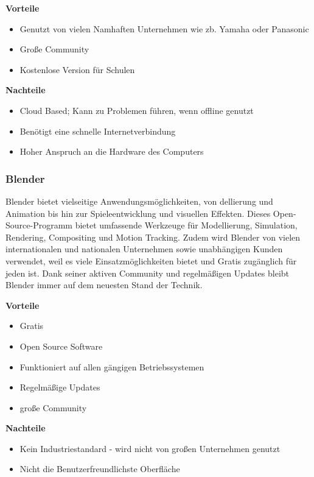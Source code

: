 \textbf{Vorteile}
\begin{itemize}
	\item Genutzt von vielen Namhaften Unternehmen wie zb. Yamaha oder Panasonic
	\item Große Community
	\item Kostenlose Version für Schulen
\end{itemize} 

\textbf{Nachteile}
\begin{itemize}
	\item Cloud Based; Kann zu Problemen führen, wenn offline genutzt 
	\item Benötigt eine schnelle Internetverbindung
	\item Hoher Anspruch an die Hardware des Computers
\end{itemize}
\cite{AutodeskFusionReviews}


\subsubsection{Blender} 
Blender bietet vielseitige Anwendungsmöglichkeiten, von dellierung und Animation bis hin zur Spieleentwicklung und visuellen Effekten. Dieses Open-Source-Programm bietet umfassende Werkzeuge für Modellierung, Simulation, Rendering, Compositing und Motion Tracking. Zudem wird Blender von vielen internationalen und nationalen Unternehmen sowie unabhängigen Kunden verwendet, weil es viele Einsatzmöglichkeiten bietet und Gratis zugänglich für jeden ist. Dank seiner aktiven Community und regelmäßigen Updates bleibt Blender immer auf dem neuesten Stand der Technik. 
\cite{Blender}

\textbf{Vorteile}
\begin{itemize}
	\item Gratis 
	\item Open Source Software
	\item Funktioniert auf allen gängigen Betriebssystemen
	\item Regelmäßige Updates
	\item große Community
\end{itemize}

\textbf{Nachteile}
\begin{itemize}
	\item Kein Industriestandard - wird nicht von großen Unternehmen genutzt
	\item Nicht die Benutzerfreundlichste Oberfläche
\end{itemize}
\cite{BlenderPros&Cons}



